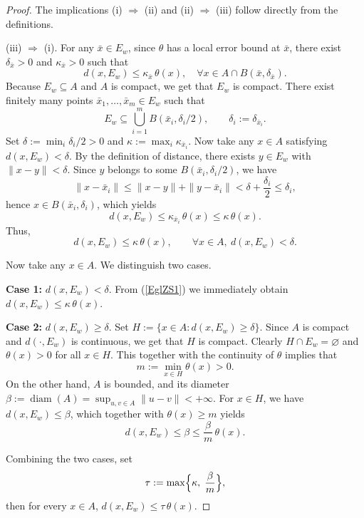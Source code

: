 \documentclass[11pt]{article}
\begin{document}
\begin{proof}
 The implications (i) $\Rightarrow$ (ii) and (ii) $\Rightarrow$ (iii) follow directly from the definitions.
	
(iii) $\Rightarrow$ (i).
	For any $\bar x\in E_w$, since $\theta$ has a local error bound at $\bar x$, there exist  $\delta_{\bar x} >0$ and $\kappa_{\bar x}>0$ such that
\[
d(x,E_w)\le \kappa_{\bar x}\,\theta(x), \quad \forall x\in A\cap B(\bar x,\delta_{\bar x}).
\]
Because $E_w\subseteq A$ and $A$ is compact,  we get that  $E_w$ is compact. There exist finitely many points $\bar x_1,\dots,\bar x_m\in E_w$ such that
\[
E_w\subseteq\bigcup_{i=1}^{m}B(\bar x_i,\delta_i/2),\qquad \delta_i:=\delta_{\bar x_i}.
\]
Set $\delta:=\min_i\delta_i/2>0$ and $\kappa:=\max_i\kappa_{\bar x_i}$. Now take any $x\in A$ satisfying $d(x,E_w)<\delta$. By the definition of distance, there exists $y\in E_w$ with $\|x-y\|<\delta$. Since $y$ belongs to some $B(\bar x_i,\delta_i/2)$, we have
\[
\|x-\bar x_i\|\le\|x-y\|+\|y-\bar x_i\|<\delta+\frac{\delta_i}{2}\le\delta_i,
\]
hence $x\in B(\bar x_i,\delta_i)$, which yields
\[
d(x,E_w)\le \kappa_{\bar x_i}\,\theta(x)\le\kappa\,\theta(x).
\]
Thus,
\begin{equation} \label{EglZS1}
	d(x,E_w)\le \kappa\,\theta(x),\qquad \forall x\in A,\ d(x,E_w)<\delta.  
\end{equation}



 
	
	Now take any $x\in A$. We distinguish two cases.
	
	\noindent\textbf{Case 1:} $d(x,E_w)<\delta$.  From (\ref{EglZS1}) we immediately obtain
$	d(x,E_w)\le \kappa\,\theta(x).$
	
	\noindent\textbf{Case 2:} $d(x,E_w)\ge \delta$. Set
$	H:=\bigl\{x\in A : d(x,E_w)\ge \delta\bigr\}.$
Since	$A$ is compact and $d(\cdot,E_w)$ is continuous, we get that $H$ is compact. Clearly $H\cap E_w=\varnothing$ and $\theta(x)>0$ for all $x\in H$. 
This together with the continuity of $\theta$  implies that
 	\[
	m:=\min_{x\in H}\theta(x)>0.
	\]
	On the other hand, $A$ is bounded, and its diameter $\beta:=\operatorname{diam}(A)=\sup_{u,v\in A}\|u-v\|<+\infty$. For $x\in H$, we have $d(x,E_w)\le \beta$, which together with $\theta(x)\ge m$ yields
	\[
	d(x,E_w)\le \beta \le \frac{\beta}{m}\,\theta(x).
	\]
	
	Combining the two cases, set
	\[
	\tau := \max\Bigl\{\kappa,\;\frac{\beta}{m}\Bigr\},
	\]
	then for every $x\in A$,
$	d(x,E_w)\le \tau \,\theta(x).$
\end{proof}
\end{document}

